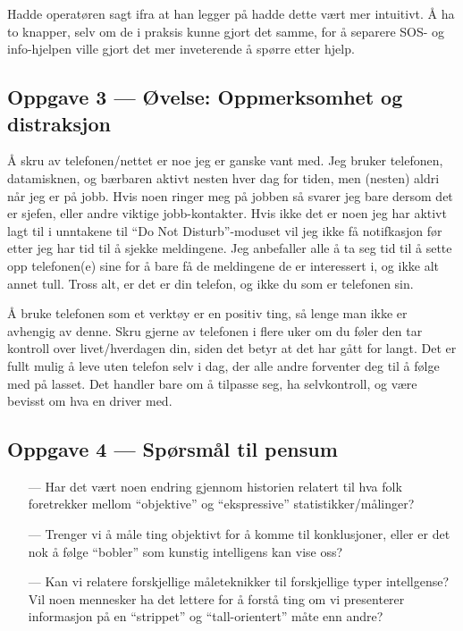 \documentclass{../../myassignment}
\begin{document}
	Hadde operat{\o}ren sagt ifra at han legger p{\aa} hadde dette v{\ae}rt mer intuitivt. {\AA} ha to knapper, selv om de i praksis  kunne gjort det samme, for {\aa} separere SOS- og info-hjelpen ville gjort det mer inveterende {\aa} sp{\o}rre etter hjelp. 


	\subsection*{Oppgave 3 --- Øvelse: Oppmerksomhet og distraksjon}

	{\AA} skru av telefonen/nettet er noe jeg er ganske vant med. Jeg bruker telefonen, datamisknen, og b{\ae}rbaren aktivt nesten hver dag for tiden, men (nesten) aldri n{\aa}r jeg er p{\aa} jobb. Hvis noen ringer meg p{\aa} jobben s{\aa} svarer jeg bare dersom det er sjefen, eller andre viktige jobb-kontakter. Hvis ikke det er noen jeg har aktivt lagt til i unntakene til ``Do Not Disturb''-moduset vil jeg ikke f{\aa} notifkasjon f{\o}r etter jeg har tid til {\aa} sjekke meldingene. Jeg anbefaller alle {\aa} ta seg tid til {\aa} sette opp telefonen(e) sine for {\aa} bare f{\aa} de meldingene de er interessert i, og ikke alt annet tull. Tross alt, er det er din telefon, og ikke du som er telefonen sin. 

	{\AA} bruke telefonen som et verkt{\o}y er en positiv ting, s{\aa} lenge man ikke er avhengig av denne. Skru gjerne av telefonen i flere uker om du f{\o}ler den tar kontroll over livet/hverdagen din, siden det betyr at det har g{\aa}tt for langt. Det er fullt mulig {\aa} leve uten telefon selv i dag, der alle andre forventer deg til {\aa} f{\o}lge med p{\aa} lasset. Det handler bare om {\aa} tilpasse seg, ha selvkontroll, og v{\ae}re bevisst om hva en driver med. 

	\subsection*{Oppgave 4 --- Spørsmål til pensum}

	\begin{itemize}
		\item[---] Har det v{\ae}rt noen endring gjennom historien relatert til hva folk foretrekker mellom ``objektive'' og ``ekspressive'' statistikker/m{\aa}linger?
		\item[---] Trenger vi {\aa} m{\aa}le ting objektivt for {\aa} komme til konklusjoner, eller er det nok {\aa} f{\o}lge ``bobler'' som kunstig intelligens kan vise oss?
		\item[---] Kan vi relatere forskjellige m{\aa}leteknikker til forskjellige typer intellgense? Vil noen mennesker ha det lettere for {\aa} forst{\aa} ting om vi presenterer informasjon p{\aa} en ``strippet'' og ``tall-orientert'' m{\aa}te enn andre? 
	\end{itemize}
\end{document}
